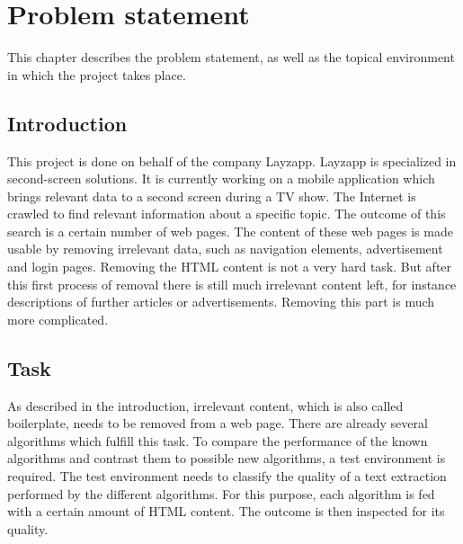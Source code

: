 
\chapter{Problem statement} %

\label{Problem statement} %



This chapter describes the problem statement, as well as the topical environment in which the project takes place.


\section{Introduction}

This project is done on behalf of the company Layzapp. Layzapp is specialized in second-screen solutions. It is currently working on a mobile application which brings relevant data to a second screen during a TV show. The Internet is crawled to find relevant information about a specific topic. The outcome of this search is a certain number of web pages. The content of these web pages is made usable by removing irrelevant data, such as navigation elements, advertisement and login pages. Removing the HTML content is not a very hard task. But after this first process of removal there is still much irrelevant content left, for instance descriptions of further articles or advertisements. Removing this part is much more complicated. 

\section{Task}

As described in the introduction, irrelevant content, which is also called boilerplate, needs to be removed from a web page. There are already several algorithms which fulfill this task. To compare the performance of the known algorithms and contrast them to possible new algorithms, a test environment is required. The test environment needs to classify the quality of a text extraction performed by the different algorithms. For this purpose, each algorithm is fed with a certain amount of HTML content. The outcome is then inspected for its quality. 

